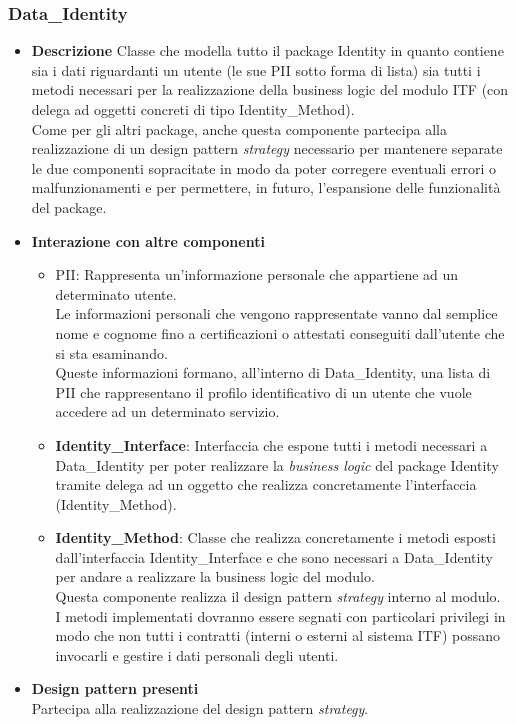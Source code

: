 \subsubsection{Data\_Identity}
\begin{itemize}
	\item \textbf{Descrizione}
	Classe che modella tutto il package Identity in quanto contiene sia i dati riguardanti un utente (le sue \gls{PII} sotto forma di lista) sia tutti i metodi necessari per la realizzazione della business logic del modulo \gls{ITF} (con delega ad oggetti concreti di tipo Identity\_Method).\\
	Come per gli altri package, anche questa componente partecipa alla realizzazione di un design pattern \textit{strategy} necessario per mantenere separate le due componenti sopracitate in modo da poter corregere eventuali errori o malfunzionamenti e per permettere, in futuro, l'espansione delle funzionalità del package.
	\item \textbf{Interazione con altre componenti}
	\begin{itemize}
		\item \gls{PII}: Rappresenta un'informazione personale che appartiene ad un determinato utente.\\
		Le informazioni personali che vengono rappresentate vanno dal semplice nome e cognome fino a certificazioni o attestati conseguiti dall'utente che si sta esaminando.\\
		Queste informazioni formano, all'interno di Data\_Identity, una lista di \gls{PII} che rappresentano il profilo identificativo di un utente che vuole accedere ad un determinato servizio.		
		\item \textbf{Identity\_Interface}: Interfaccia che espone tutti i metodi necessari a Data\_Identity per poter realizzare la \textit{business logic} del package Identity tramite delega ad un oggetto che realizza concretamente l'interfaccia (Identity\_Method).
		\item \textbf{Identity\_Method}: Classe che realizza concretamente i metodi esposti dall'interfaccia Identity\_Interface e che sono necessari a Data\_Identity per andare a realizzare la business logic del modulo.\\
		Questa componente realizza il design pattern \textit{strategy} interno al modulo.\\
		I metodi implementati dovranno essere segnati con particolari privilegi in modo che non tutti i contratti (interni o esterni al sistema \gls{ITF}) possano invocarli e gestire i dati personali degli utenti.	
	\end{itemize}
	\item \textbf{Design pattern presenti}\\
	Partecipa alla realizzazione del design pattern \textit{strategy}.
\end{itemize}
